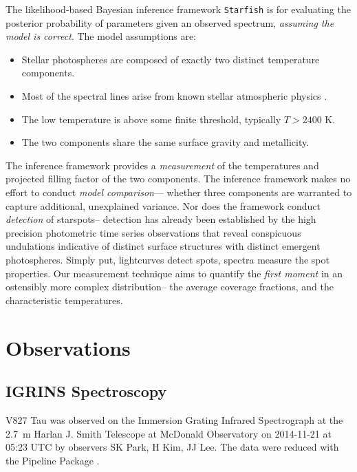 \documentclass[revtex4]{emulateapj}%
\begin{document}
The likelihood-based Bayesian inference framework \texttt{Starfish} is for evaluating the posterior probability of parameters given an observed spectrum, \emph{assuming the model is correct}.  The model assumptions are:

\begin{itemize}
  \item Stellar photospheres are composed of exactly two distinct temperature components.
  \item Most of the spectral lines arise from known stellar atmospheric physics \citep{husser13}.
  \item The low temperature is above some finite threshold, typically $T>2400$ K.
  \item The two components share the same surface gravity and metallicity.
\end{itemize}

The inference framework provides a \emph{measurement} of the temperatures and projected filling factor of the two components.  The inference framework makes no effort to conduct \emph{model comparison}--- whether three components are warranted to capture additional, unexplained variance.  Nor does the framework conduct \emph{detection} of starspots-- detection has already been established by the high precision photometric time series observations that reveal conspicuous undulations indicative of distinct surface structures with distinct emergent photospheres.  Simply put, lightcurves detect spots, spectra measure the spot properties.  Our measurement technique aims to quantify the \emph{first moment} in an ostensibly more complex distribution-- the average coverage fractions, and the characteristic temperatures.



\section{Observations}\label{sec:obs}

\subsection{IGRINS Spectroscopy}\label{sec:igrins}

V827 Tau was observed on the Immersion Grating Infrared Spectrograph \citep[IGRINS]{park14} at the 2.7~m Harlan J. Smith Telescope at McDonald Observatory on 2014-11-21 at 05:23 UTC by observers SK Park, H Kim, JJ Lee.  The data were reduced with the Pipeline Package \citep{jaejoonlee15}.
\end{document}
